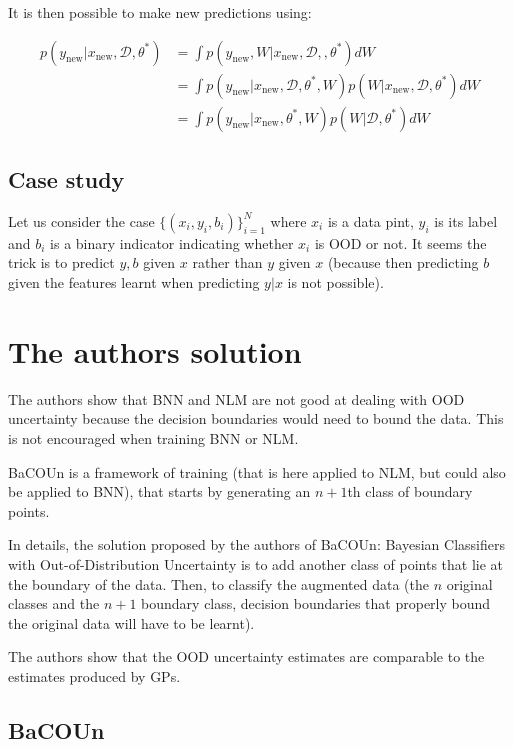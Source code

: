 \documentclass{article}
\theoremstyle{definition}
\theoremstyle{definition}
\theoremstyle{remark}
\begin{document}
It is then possible to make new predictions using:

\begin{align} p(y_{\text{new}}|x_{\text{new}},\mathcal{D},\theta^*) & =\int  p(y_{\text{new}},W|x_{\text{new}},\mathcal{D},,\theta^*) dW\\
& =\int  p(y_{\text{new}}|x_{\text{new}},\mathcal{D},\theta^*,W)p(W|x_{\text{new}},\mathcal{D},\theta^*) dW \\
& =\int  p(y_{\text{new}}|x_{\text{new}},\theta^*,W)p(W|\mathcal{D},\theta^*) dW   \end{align}


\subsection{Case study}

Let us consider the case $\{(x_i,y_i,b_i)\}_{i=1}^N$ where $x_i$ is a data pint, $y_i$ is its label and $b_i$ is a binary indicator indicating whether $x_i$ is OOD or not. It seems the trick is to predict $y,b$ given $x$ rather than $y$ given $x$ (because then predicting $b$ given the features learnt when predicting $y|x$ is not possible).

\section{The authors solution}

The authors show that BNN and NLM are not good at dealing with OOD uncertainty because the decision boundaries would need to bound the data. This is not encouraged when training BNN or NLM.

BaCOUn is a framework of training (that is here applied to NLM, but could also be applied to BNN), that starts by generating an $n+1$th class of boundary points.

In details, the solution proposed by the authors of BaCOUn: Bayesian Classifiers with Out-of-Distribution Uncertainty is to add another class of points that lie at the boundary of the data. Then, to classify the augmented data (the $n$ original classes and the $n+1$ boundary class, decision boundaries that properly bound the original data will have to be learnt).

The authors show that the OOD uncertainty estimates are comparable to the estimates produced by GPs.


\subsection{BaCOUn}
\end{document}
